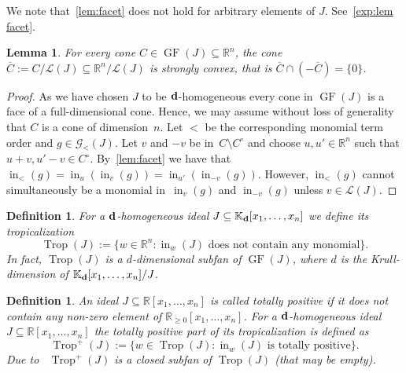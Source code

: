 \documentclass[10pt,a4paper]{amsart}
\newcommand{\thlabel}[1]{\label{#1}}
\newcommand{\thref}[1]{\ref{#1}}
\newtheorem{Lemma}[Theorem]{Lemma}
\newtheorem{Definition}[Theorem]{Definition}
\numberwithin{equation}{section}
\DeclareMathOperator{\init}{in}
\DeclareMathOperator{\GF}{GF}
\DeclareMathOperator{\trop}{Trop}
\begin{document}
We note that~\thref{lem:facet} does not hold for arbitrary elements of $J$. See~\thref{exp:lem facet}.

\begin{Lemma}\thlabel{lem:strictly_convex}
For every cone $C\in\GF(J) \subseteq \mathbb R^n$, the cone $\overline C :=C / \mathcal{L}(J)\subseteq \mathbb R^n / \mathcal{L}(J)$ is strongly convex, that is $\overline C\cap (- \overline C)=\{0\}$.
\end{Lemma}
\begin{proof}
As we have chosen $J$ to be ${\bf d}$-homogeneous every cone in $\GF(J)$ is a face of a full-dimensional cone.
Hence, we may assume without loss of generality that $C$ is a cone of dimension~$n$.
Let $<$ be the corresponding monomial term order and $g\in\mathcal{G}_<(J)$.
Let $v$ and $-v$ be in~$C\setminus C^\circ$ and choose $u,u' \in \mathbb{R}^n$ such that $u+v,u'-v \in C^{\circ}$. By~\thref{lem:facet} we have that
$\init_{<}(g)=\init_u(\init_v(g))=\init_{u'}(\init_{-v}(g))$. However, $\init_{<}(g)$ cannot simultaneously be a monomial in~$\init_v(g)$ and $\init_{-v}(g)$ unless $v\in \mathcal L(J)$.
\end{proof}

\begin{Definition}\thlabel{def:trop}
For a ${\bf d}$-homogeneous ideal $J\subseteq \mathbb K_{\bf d}[x_1, \dots , x_n]$ we define its {\it tropicalization}
\begin{displaymath}
\trop(J):=\big\{w\in \mathbb R^n \colon \init_w(J) \text{ does not contain any monomial}\big\}.
\end{displaymath}
In fact, $\trop(J)$ is a $d$-dimensional subfan of $\GF(J)$, where $d$ is the Krull-dimension of $\mathbb K_{\bf d}[x_1,\dots,\linebreak x_n]/J$.
\end{Definition}


\begin{Definition}\thlabel{def:trop+}
An ideal $J\subseteq \mathbb R[x_1,\dots,x_n]$ is called {\it totally positive} if it does not contain any non-zero element of $\mathbb R_{\ge 0}[x_1,\dots,x_n]$.
For a ${\bf d}$-homogeneous ideal $J\subseteq \mathbb R[x_1,\dots,x_n]$ the {\it totally positive part} of its tropicalization is defined as
\begin{displaymath}
\trop^+(J):=\{w\in \trop(J)\colon \init_w(J) \text{ is totally positive}\}.
\end{displaymath}
Due to~\cite{SW05} $\trop^+(J)$ is a closed subfan of $\trop(J)$ (that may be empty).
\end{Definition}
\end{document}

